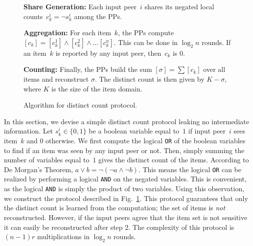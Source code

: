 \documentclass[letterpaper,11pt,onecolumn,titlepage]{article}
\begin{document}
\begin{figure}[t]
	\begin{boxedminipage}{1\textwidth}
	\begin{small}
	\begin{compactenum}

	\item \textbf{Share Generation:} Each input peer~$i$ shares its negated local counts~$c_k^i = \neg s_k^i$ among the PPs.
	


	\item \textbf{Aggregation:} For each item~$k$, the PPs
	compute $[c_k] = [c_k^1] \wedge [c_k^2] \wedge \ldots [c_k^n]$. This can
	be done in $\log_2 n$ rounds. If an item~$k$ is reported 
	by any input peer, then~$c_k$ is $0$.
	
	\item \textbf{Counting:} Finally, the PPs build 
	the sum $[\sigma] = \sum [c_k]$ over all items and reconstruct $\sigma$. 
	The distinct count is then given by $K-\sigma$, where $K$ is the size of the
	item domain.

	\end{compactenum}
	\end{small}
	\end{boxedminipage}
	\caption{Algorithm for distinct count protocol.}
	\label{box:count}
\end{figure}







In this section, we devise a simple distinct count protocol leaking no intermediate
information. 
Let $s_k^i \in \{0,1\}$ be a boolean variable equal to~$1$ if input peer~$i$ sees item~$k$
and $0$ otherwise. We first compute the logical \texttt{OR} of the
boolean variables to find if an item was seen by any input peer or
not. Then, simply summing the number of variables equal to~$1$ gives
the distinct count of the items. 
According to De Morgan's Theorem, $a \vee b = \neg(\neg a \wedge \neg b)$.
This means the logical \texttt{OR} can be realized by performing a logical \texttt{AND}
on the negated variables. This is convenient, as the logical \texttt{AND} is
simply the product of two variables. Using this observation, we construct the protocol described in Fig.~\ref{box:count}.
This protocol guarantees that only the distinct count is learned from
the computation; the set of items is \emph{not}
reconstructed. However, if the input peers agree that the item set is not
sensitive it can easily be reconstructed after step 2.
The complexity of this protocol is $(n-1)r$ multiplications in $\log_2 n$ rounds.
\end{document}
